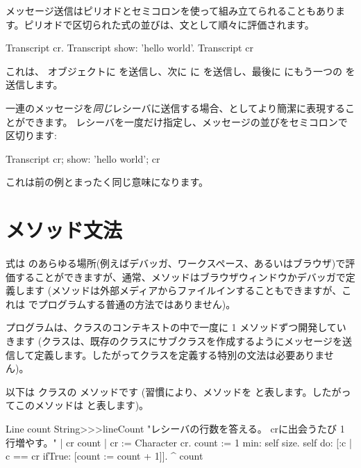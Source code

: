 \documentclass[a4paper,10pt,twoside]{book}
\begin{document}
メッセージ送信はピリオドとセミコロンを使って組み立てられることもあります。ピリオドで区切られた式の並びは、文として順々に評価されます。

\begin{code}{}
Transcript cr.
Transcript show: 'hello world'.
Transcript cr
\end{code}

\noindent
これは、 オブジェクトに  を送信し、次に  に  を送信し、最後に  にもう一つの  を送信します。

一連のメッセージを\emph{同じ}レシーバに送信する場合、としてより簡潔に表現することができます。
レシーバを一度だけ指定し、メッセージの並びをセミコロンで区切ります:

\begin{code}{}
Transcript cr;
    show: 'hello world';
    cr
\end{code}
これは前の例とまったく同じ意味になります。

\section{メソッド文法}

式は \pharo のあらゆる場所(例えばデバッガ、ワークスペース、あるいはブラウザ)で評価することができますが、通常、メソッドはブラウザウィンドウかデバッガで定義します
(メソッドは外部メディアからファイルインすることもできますが、これは \pharo でプログラムする普通の方法ではありません)。

プログラムは、クラスのコンテキストの中で一度に 1 メソッドずつ開発していきます
(クラスは、既存のクラスにサブクラスを作成するようにメッセージを送信して定義します。したがってクラスを定義する特別の文法は必要ありません)。

以下は  クラスの  メソッドです
(習慣により、メソッドを  と表します。したがってこのメソッドは  と表します)。

\begin{method}[lineCount]{Line count}
String>>>lineCount
   "レシーバの行数を答える。
   crに出会うたび 1 行増やす。"
   | cr count |
   cr := Character cr.
   count := 1 min: self size.
   self do:
      [:c | c == cr ifTrue: [count := count + 1]].
   ^ count
\end{method}
\end{document}
